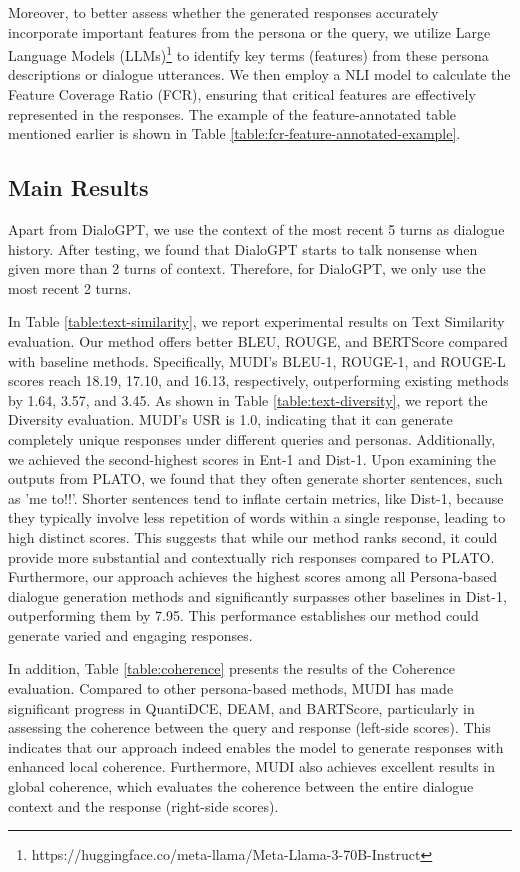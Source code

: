 \documentclass[letterpaper]{article} %
\begin{document}
Moreover, to better assess whether the generated responses accurately incorporate important features from the persona or the query, we utilize Large Language Models (LLMs)\footnote[4]{https://huggingface.co/meta-llama/Meta-Llama-3-70B-Instruct} to identify key terms (features) from these persona descriptions or dialogue utterances. We then employ a NLI model to calculate the Feature Coverage Ratio (FCR), ensuring that critical features are effectively represented in the responses. The example of the feature-annotated table mentioned earlier is shown in Table \ref{table:fcr-feature-annotated-example}.

\subsection{Main Results}

Apart from DialoGPT, we use the context of the most recent 5 turns as dialogue history. After testing, we found that DialoGPT starts to talk nonsense when given more than 2 turns of context. Therefore, for DialoGPT, we only use the most recent 2 turns.

In Table \ref{table:text-similarity}, we report experimental results on Text Similarity evaluation. Our method offers better BLEU, ROUGE, and BERTScore compared with baseline methods. Specifically, MUDI's BLEU-1, ROUGE-1, and ROUGE-L scores reach 18.19, 17.10, and 16.13, respectively, outperforming existing methods by 1.64, 3.57, and 3.45. As shown in Table \ref{table:text-diversity}, we report the Diversity evaluation. MUDI's USR is 1.0, indicating that it can generate completely unique responses under different queries and personas. Additionally, we achieved the second-highest scores in Ent-1 and Dist-1. Upon examining the outputs from PLATO, we found that they often generate shorter sentences, such as 'me to!!'. Shorter sentences tend to inflate certain metrics, like Dist-1, because they typically involve less repetition of words within a single response, leading to high distinct scores. This suggests that while our method ranks second, it could provide more substantial and contextually rich responses compared to PLATO. Furthermore, our approach achieves the highest scores among all Persona-based dialogue generation methods and significantly surpasses other baselines in Dist-1, outperforming them by 7.95. This performance establishes our method could generate varied and engaging responses.

In addition, Table \ref{table:coherence} presents the results of the Coherence evaluation. Compared to other persona-based methods, MUDI has made significant progress in QuantiDCE, DEAM, and BARTScore, particularly in assessing the coherence between the query and response (left-side scores). This indicates that our approach indeed enables the model to generate responses with enhanced local coherence. Furthermore, MUDI also achieves excellent results in global coherence, which evaluates the coherence between the entire dialogue context and the response (right-side scores).
\end{document}
